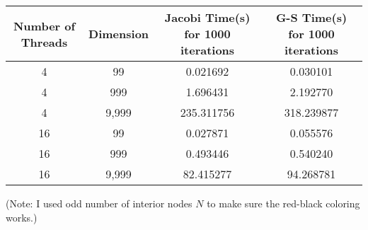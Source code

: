\documentclass[11pt]{article}
\begin{document}
\begin{enumerate}
\begin{enumerate}
\begin{tabular}{c|c|c|c}
            \end{tabular}
            
            
            \begin{tabular}{c|c|c|c}
           Number of Threads & Dimension & Jacobi Time(s) for 1000 iterations & G-S Time(s) for 1000 iterations \\ \hline
            
            4 & 99 & 0.021692 & 0.030101 \\ 
            4 & 999 & 1.696431 & 2.192770 \\
            4 & 9,999 & 235.311756 & 318.239877 \\ \hline
            16 & 99 & 0.027871 & 0.055576 \\ 
            16 & 999 & 0.493446 & 0.540240 \\
            16 & 9,999 & 82.415277 & 94.268781 \\ \hline
            
            \end{tabular}
            
            (Note: I used odd number of interior nodes $N$ to make sure the red-black coloring works.)
            
    \end{enumerate}
   
    
\end{enumerate}
\end{document}
